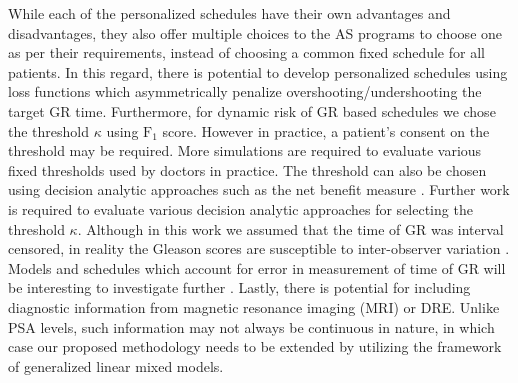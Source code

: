 While each of the personalized schedules have their own advantages and disadvantages, they also offer multiple choices to the AS programs to choose one as per their requirements, instead of choosing a common fixed schedule for all patients. In this regard, there is potential to develop personalized schedules using loss functions which asymmetrically penalize overshooting/undershooting the target GR time. Furthermore, for dynamic risk of GR based schedules we chose the threshold $\kappa$ using $\mbox{F}_1$ score. However in practice, a patient's consent on the threshold may be required. More simulations are required to evaluate various fixed thresholds used by doctors in practice. The threshold can also be chosen using decision analytic approaches such as the net benefit measure \citep{vickers2006decision}. Further work is required to evaluate various decision analytic approaches for selecting the threshold $\kappa$. Although in this work we assumed that the time of GR was interval censored, in reality the Gleason scores are susceptible to inter-observer variation \citep{Gleason_interobs_var}. Models and schedules which account for error in measurement of time of GR will be interesting to investigate further \citep{coley2017}. Lastly, there is potential for including diagnostic information from magnetic resonance imaging (MRI) or DRE. Unlike PSA levels, such information may not always be continuous in nature, in which case our proposed methodology needs to be extended by utilizing the framework of generalized linear mixed models.